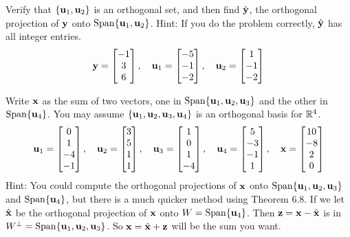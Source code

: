 \begin{exercise} %
	Verify that $\{\vect{u}_1,\vect{u}_2\}$ is an orthogonal set, and then find $\yhat$, the orthogonal projection of $\vect{y}$ onto $\Span\{\vect{u}_1,\vect{u}_2\}$. Hint: If you do the problem correctly, $\yhat$ has all integer entries.
	$$ \vect{y} = \begin{bmatrix}-1\\3\\6\end{bmatrix}, \quad
	\vect{u}_1 = \begin{bmatrix}-5\\-1\\-2\end{bmatrix}, \quad
	\vect{u}_2 = \begin{bmatrix}1\\-1\\-2\end{bmatrix}$$
\end{exercise}
\vfill


\begin{exercise} %
	Write $\vect{x}$ as the sum of two vectors, one in $\Span\{\vect{u}_1,\vect{u}_2,\vect{u}_3\}$ and the other in $\Span\{\vect{u}_4\}$. You may assume $\{\vect{u}_1,\vect{u}_2,\vect{u}_3,\vect{u}_4\}$ is an orthogonal basis for $\R^4$.
	$$ \vect{u}_1 = \begin{bmatrix}0\\1\\-4\\-1\end{bmatrix}, \quad
	\vect{u}_2 = \begin{bmatrix}3\\5\\1\\1\end{bmatrix}, \quad
	\vect{u}_3 = \begin{bmatrix}1\\0\\1\\-4\end{bmatrix}, \quad
	\vect{u}_4 = \begin{bmatrix}5\\-3\\-1\\1\end{bmatrix}, \quad
	\vect{x} = \begin{bmatrix}10\\-8\\2\\0\end{bmatrix}$$
	Hint: You could compute the orthogonal projections of $\vect{x}$ onto $\Span\{\vect{u}_1,\vect{u}_2,\vect{u}_3\}$ and $\Span\{\vect{u}_4\}$, but there is a much quicker method using Theorem 6.8. If we let $\xhat$ be the orthogonal projection of $\vect{x}$ onto $W=\Span\{\vect{u}_4\}$. Then $\vect{z}=\vect{x}-\xhat$ is in $W^\perp=\Span\{\vect{u}_1,\vect{u}_2,\vect{u}_3\}$. So $\vect{x}=\xhat+\vect{z}$ will be the sum you want.
\end{exercise}
\vfill



